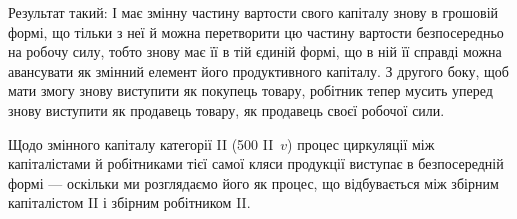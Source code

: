 Результат такий: І має змінну частину вартости свого капіталу знову
в грошовій формі, що тільки з неї й можна перетворити цю частину
вартости безпосередньо на робочу силу, тобто знову має її в тій єдиній
формі, що в ній її справді можна авансувати як змінний елемент його
продуктивного капіталу. З другого боку, щоб мати змогу знову виступити
як покупець товару, робітник тепер мусить уперед знову виступити
як продавець товару, як продавець своєї робочої сили.

Щодо змінного капіталу категорії II (500 II~$v$) процес циркуляції
між капіталістами й робітниками тієї самої кляси продукції виступає в
безпосередній формі — оскільки ми розглядаємо його як процес, що відбувається
між збірним капіталістом II і збірним робітником II.
